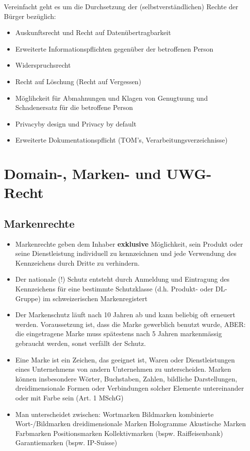 \documentclass{report}
\theoremstyle{definition}
\theoremstyle{example}
\begin{document}
Vereinfacht geht es um die Durchsetzung der (selbstverständlichen) Rechte der Bürger bezüglich:
\begin{itemize}
   \item Auskunftsrecht und Recht auf Datenübertragbarkeit
   \item Erweiterte Informationspflichten gegenüber der betroffenen Person
   \item Widerspruchsrecht
   \item Recht auf Löschung (Recht auf Vergessen)
   \item Möglihckeit für Abmahnungen und Klagen von Genugtuung und Schadenersatz für die betroffene Person
   \item Privacyby design und Privacy by default
   \item Erweiterte Dokumentationspflicht (TOM's, Verarbeitungsverzeichnisse)
\end{itemize}


\chapter{Domain-, Marken- und UWG-Recht}

\section{Markenrechte}
\begin{itemize}
   \item Markenrechte geben dem Inhaber \textbf{exklusive} Möglichkeit, sein Produkt oder seine Dienstleistung individuell zu kennzeichnen und jede Verwendung des Kennzeichens durch Dritte zu verhindern.
   \item Der nationale (!) Schutz entsteht durch Anmeldung und Eintragung des Kennzeichens für eine bestimmte Schutzklasse (d.h. Produkt- oder DL-Gruppe) im schweizerischen Markenregistert
   \item Der Markenschutz läuft nach 10 Jahren ab und kann beliebig oft erneuert werden. Voraussetzung ist, dass die Marke gewerblich benutzt wurde, ABER: die eingetragene Marke muss spätestens nach 5 Jahren markenmässig gebraucht werden, sonst verfällt der Schutz.
   \item Eine Marke ist ein Zeichen, das geeignet ist, Waren oder Dienstleistungen eines Unternehmens von andern Unternehmen zu unterscheiden. Marken können insbesondere Wörter, Buchstaben, Zahlen, bildliche Darstellungen, dreidimensionale Formen oder Verbindungen solcher Elemente untereinander oder mit Farbe sein (Art. 1 MSchG)
   \item Man unterscheidet zwischen:
   \subitem Wortmarken
   \subitem Bildmarken
   \subitem kombinierte Wort-/Bildmarken
   \subitem dreidimensionale Marken
   \subitem Hologramme
   \subitem Akustische Marken
   \subitem Farbmarken
   \subitem Positionsmarken
   \subitem Kollektivmarken (bspw. Raiffeisenbank)
   \subitem Garantiemarken (bspw. IP-Suisse)
\end{itemize}
\end{document}
